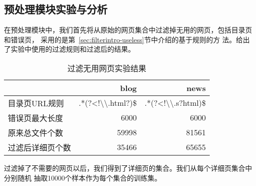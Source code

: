 \subsection{预处理模块实验与分析}
\label{sec:experiement:pre}
在预处理模块中，我们首先将从原始的网页集合中过滤掉无用的网页，包括目录页和错误页，
采用的是第~\ref{sec:filterintro-useless}节中介绍的基于规则的方
法。给出了实验中使用的过滤规则和过滤后的结果。
\begin{table}[h]
  \centering
  \caption{过滤无用网页实验结果}
  \label{experiment:tab:filter}
\begin{tabular}{lrr}
  \toprule
 & blog & news \\
\hline
目录页URL规则 & .*(?<!\textbackslash\textbackslash.html?)\$ & .*(?<!\textbackslash\textbackslash.s?html)\$ \\
错误页最大长度 & 6000 & 6000 \\
原来总文件个数 & 59998 & 81561 \\
过滤后详细页个数 & 35466 & 65655 \\
\bottomrule
\end{tabular}
\end{table}
\begin{comment}
#+ORGTBL: SEND 过滤无用网页 orgtbl-to-latex :splice nil :skip 0
|                  |                                       blog |                                        news |
|------------------+--------------------------------------------+---------------------------------------------|
| 目录页URL规则    | .*(?<!\textbackslash\textbackslash.html?)$ | .*(?<!\textbackslash\textbackslash.s?html)$ |
| 错误页最大长度   |                                       6000 |                                        6000 |
| 原来总文件个数   |                                      59998 |                                       81561 |
| 过滤后详细页个数 |                                      35466 |                                       65655 |
\end{comment}

过滤掉了不需要的网页以后，我们得到了详细页的集合。我们从每个详细页集合中分别随机
抽取10000个样本作为每个集合的训练集。

